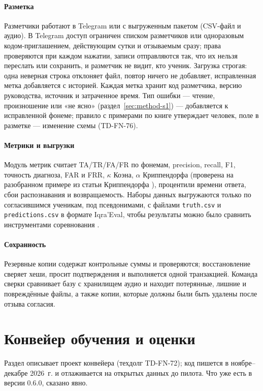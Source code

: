 \paragraph{Разметка} Разметчики работают в Telegram или с выгруженным пакетом (CSV-файл и аудио). В Telegram
доступ ограничен списком разметчиков или одноразовым кодом-приглашением, действующим сутки и отзываемым
сразу; права проверяются при каждом нажатии, записи отправляются так, что их нельзя переслать или
сохранить, и разметчик не видит, кто ученик. Загрузка строгая: одна неверная строка отклоняет файл,
повтор ничего не добавляет, исправленная метка добавляется с историей. Каждая метка хранит код
разметчика, версию руководства, источник и затраченное время. Тип ошибки --- чтение, произношение или
«не ясно» (раздел~\ref{sec:method-s1}) --- добавляется к исправленной фонеме; правило с примерами по книге
утверждает человек, поле в разметке --- изменение схемы (TD-FN-76).

\paragraph{Метрики и выгрузки} Модуль метрик считает TA/TR/FA/FR по фонемам, precision, recall, F1,
точность диагноза, FAR и FRR, $\kappa$ Коэна, $\alpha$ Криппендорфа (проверена на разобранном примере из
статьи Криппендорфа \cite{SRC-065}), процентили времени ответа, сбои распознавания и возвращаемость.
Наборы данных выгружаются только по согласившимся ученикам, под псевдонимами, с файлами \texttt{truth.csv}
и \texttt{predictions.csv} в формате Iqra'Eval, чтобы результаты можно было сравнить инструментами
соревнования \cite{SRC-066}.

\paragraph{Сохранность} Резервные копии содержат контрольные суммы и проверяются; восстановление сверяет
хеши, просит подтверждения и выполняется одной транзакцией. Команда сверки сравнивает базу с хранилищем
аудио и находит потерянные, лишние и повреждённые файлы, а также копии, которые должны были быть удалены
после отзыва согласия.

\section{Конвейер обучения и оценки}\label{sec:impl-training}

\begin{notebox}
Раздел описывает проект конвейера (техдолг TD-FN-72); код пишется в ноябре--декабре 2026~г. и
отлаживается на открытых данных до пилота. Что уже есть в версии 0.6.0, сказано явно.
\end{notebox}

